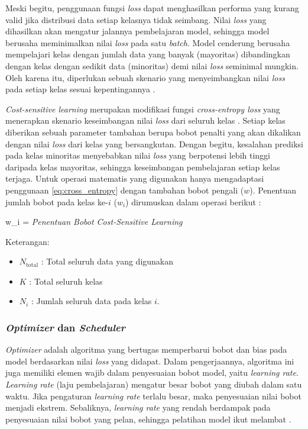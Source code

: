Meski begitu, penggunaan fungsi \textit{loss} dapat menghasilkan performa yang kurang valid jika distribusi data setiap kelasnya tidak seimbang.
Nilai \textit{loss} yang dihasilkan akan mengatur jalannya pembelajaran model, sehingga model berusaha meminimalkan nilai \textit{loss} pada satu \textit{batch}.
Model cenderung berusaha mempelajari kelas dengan jumlah data yang banyak (mayoritas) dibandingkan dengan kelas dengan sedikit data (minoritas) demi nilai \textit{loss} seminimal mungkin.
Oleh karena itu, diperlukan sebuah skenario yang menyeimbangkan nilai \textit{loss} pada setiap kelas sesuai kepentingannya \cite{johnson2019survey}. \par

\textit{Cost-sensitive learning} merupakan modifikasi fungsi \textit{cross-entropy loss} yang menerapkan skenario keseimbangan nilai \textit{loss} dari seluruh kelas \cite{elkan2001foundations}. 
Setiap kelas diberikan sebuah parameter tambahan berupa bobot penalti yang akan dikalikan dengan nilai \textit{loss} dari kelas yang bersangkutan. 
Dengan begitu, kesalahan prediksi pada kelas minoritas menyebabkan nilai \textit{loss} yang berpotensi lebih tinggi daripada kelas mayoritas, sehingga keseimbangan pembelajaran setiap kelas terjaga. 
Untuk operasi matematis yang digunakan hanya mengadaptasi penggunaan \ref{eq:cross_entropy} dengan tambahan bobot pengali ($w$).
Penentuan jumlah bobot pada kelas ke-$i$ ($w_i$) dirumuskan dalam operasi berikut \cite{scikit-learn}: \par

\begin{equationcaptioned}{
      w_i = 
      \label{eq:bobot_cost_sensitive}
  }{
      \textit{Penentuan Bobot \textit{Cost-Sensitive Learning}}
  }
  \end{equationcaptioned}

  \noindent Keterangan:
  \begin{itemize}
      \item $N_\text{total}$ : Total seluruh data yang digunakan
      \item $K$ : Total seluruh kelas
      \item $N_i$ : Jumlah seluruh data pada kelas $i$.
  \end{itemize}
  \medskip

\subsubsection{\textit{Optimizer} dan \textit{Scheduler}} \label{II.Teori10.3}
\textit{Optimizer} adalah algoritma yang bertugas memperbarui bobot dan bias pada model berdasarkan nilai \textit{loss} yang didapat.
Dalam pengerjaannya, algoritma ini juga memiliki elemen wajib dalam penyesuaian bobot model, yaitu \textit{learning rate}.
\textit{Learning rate} (laju pembelajaran) mengatur besar bobot yang diubah dalam satu waktu.
Jika pengaturan \textit{learning rate} terlalu besar, maka penyesuaian nilai bobot menjadi ekstrem. 
Sebaliknya, \textit{learning rate} yang rendah berdampak pada penyesuaian nilai bobot yang pelan, sehingga pelatihan model ikut melambat \cite{goodfellow2016deep}. \par

